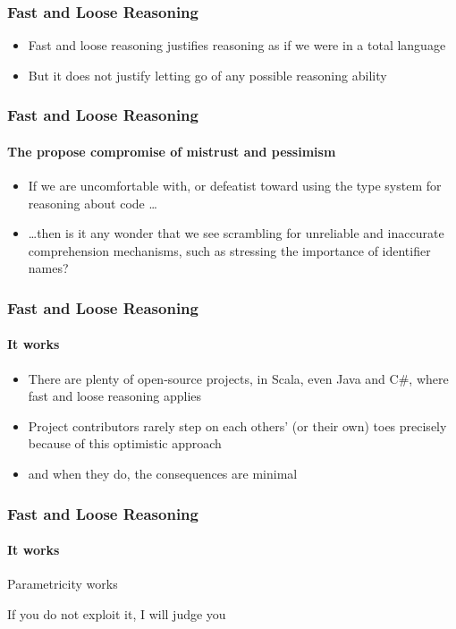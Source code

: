 \begin{frame}[fragile]
\frametitle{Fast and Loose Reasoning}
\begin{itemize}
  \item<1> Fast and loose reasoning justifies reasoning as if we were in a total language
  \item<2> But it does not justify letting go of any possible reasoning ability
\end{itemize}
\end{frame}

\begin{frame}[fragile]
\frametitle{Fast and Loose Reasoning}
\framesubtitle{The propose compromise of mistrust and pessimism}
\begin{itemize}
  \item<1> If we are uncomfortable with, or defeatist toward using the type system for reasoning about code \ldots
  \item<2> \ldots then is it any wonder that we see scrambling for unreliable and inaccurate comprehension mechanisms, such as stressing the importance of identifier names?
\end{itemize}
\end{frame}

\begin{frame}[fragile]
\frametitle{Fast and Loose Reasoning}
\framesubtitle{It works}
\begin{itemize}
  \item<1> There are plenty of open-source projects, in Scala, even Java and C\#, where fast and loose reasoning applies
  \item<2> Project contributors rarely step on each others' (or their own) toes precisely because of this optimistic approach
  \item<3> and when they do, the consequences are minimal
\end{itemize}
\end{frame}

\begin{frame}[fragile]
\frametitle{Fast and Loose Reasoning}
\framesubtitle{It works}
\begin{center}
Parametricity works
\end{center}
\begin{center}
If you do not exploit it, I will judge you
\end{center}
\end{frame}